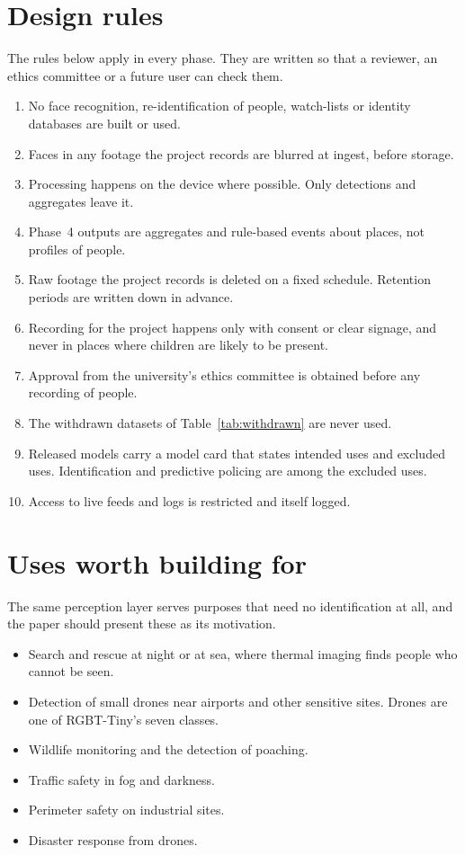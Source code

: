 \section{Design rules}
\label{sec:design-rules}

The rules below apply in every phase. They are written so that a reviewer,
an ethics committee or a future user can check them.

\begin{enumerate}
  \item No face recognition, re-identification of people, watch-lists or
        identity databases are built or used.
  \item Faces in any footage the project records are blurred at ingest,
        before storage.
  \item Processing happens on the device where possible. Only detections
        and aggregates leave it.
  \item Phase~4 outputs are aggregates and rule-based events about places,
        not profiles of people.
  \item Raw footage the project records is deleted on a fixed schedule.
        Retention periods are written down in advance.
  \item Recording for the project happens only with consent or clear
        signage, and never in places where children are likely to be
        present.
  \item Approval from the university's ethics committee is obtained before
        any recording of people.
  \item The withdrawn datasets of Table~\ref{tab:withdrawn} are never used.
  \item Released models carry a model card that states intended uses and
        excluded uses. Identification and predictive policing are among the
        excluded uses.
  \item Access to live feeds and logs is restricted and itself logged.
\end{enumerate}

\section{Uses worth building for}

The same perception layer serves purposes that need no identification at
all, and the paper should present these as its motivation.
\begin{itemize}
  \item Search and rescue at night or at sea, where thermal imaging finds
        people who cannot be seen.
  \item Detection of small drones near airports and other sensitive sites.
        Drones are one of RGBT-Tiny's seven classes.
  \item Wildlife monitoring and the detection of poaching.
  \item Traffic safety in fog and darkness.
  \item Perimeter safety on industrial sites.
  \item Disaster response from drones.
\end{itemize}

